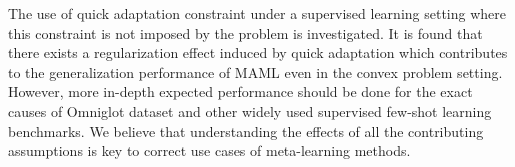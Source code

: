 The use of quick adaptation constraint under a supervised learning setting where this constraint is not imposed by the problem is investigated. It is found that there exists a regularization effect induced by quick adaptation which contributes to the generalization performance of MAML even in the convex problem setting. However, more in-depth expected performance should be done for the exact causes of Omniglot dataset and other widely used supervised few-shot learning benchmarks. We believe that understanding the effects of all the contributing assumptions is key to correct use cases of meta-learning methods.

